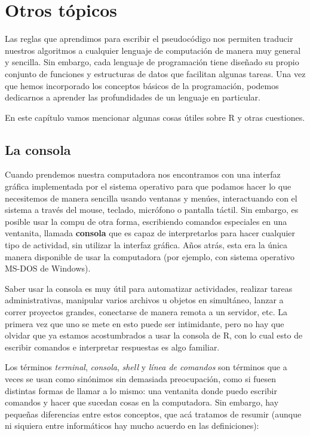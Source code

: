 \documentclass[
]{book}
\begin{document}
\hypertarget{otros-tuxf3picos}{%
\chapter{Otros tópicos}\label{otros-tuxf3picos}}

Las reglas que aprendimos para escribir el pseudocódigo nos permiten traducir nuestros algoritmos a cualquier lenguaje de computación de manera muy general y sencilla. Sin embargo, cada lenguaje de programación tiene diseñado su propio conjunto de funciones y estructuras de datos que facilitan algunas tareas. Una vez que hemos incorporado los conceptos básicos de la programación, podemos dedicarnos a aprender las profundidades de un lenguaje en particular.

En este capítulo vamos mencionar algunas cosas útiles sobre R y otras cuestiones.

\hypertarget{la-consola}{%
\section{La consola}\label{la-consola}}

Cuando prendemos nuestra computadora nos encontramos con una interfaz gráfica implementada por el sistema operativo para que podamos hacer lo que necesitemos de manera sencilla usando ventanas y menúes, interactuando con el sistema a través del mouse, teclado, micrófono o pantalla táctil. Sin embargo, es posible usar la compu de otra forma, escribiendo comandos especiales en una ventanita, llamada \textbf{consola} que es capaz de interpretarlos para hacer cualquier tipo de actividad, sin utilizar la interfaz gráfica. Años atrás, esta era la única manera disponible de usar la computadora (por ejemplo, con sistema operativo MS-DOS de Windows).

Saber usar la consola es muy útil para automatizar actividades, realizar tareas administrativas, manipular varios archivos u objetos en simultáneo, lanzar a correr proyectos grandes, conectarse de manera remota a un servidor, etc. La primera vez que uno se mete en esto puede ser intimidante, pero no hay que olvidar que ya estamos acostumbrados a usar la consola de R, con lo cual esto de escribir comandos e interpretar respuestas es algo familiar.

Los términos \emph{terminal}, \emph{consola}, \emph{shell} y \emph{línea de comandos} son términos que a veces se usan como sinónimos sin demasiada preocupación, como si fuesen distintas formas de llamar a lo mismo: una ventanita donde puedo escribir comandos y hacer que sucedan cosas en la computadora. Sin embargo, hay pequeñas diferencias entre estos conceptos, que acá tratamos de resumir (aunque ni siquiera entre informáticos hay mucho acuerdo en las definiciones):
\end{document}
